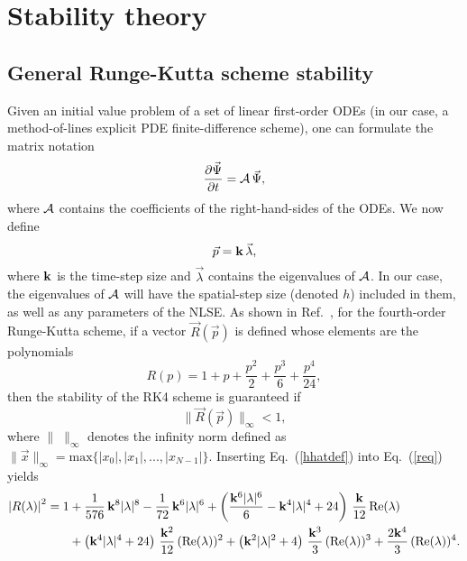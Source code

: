 \documentclass{article}
\begin{document}
\section{Stability theory}
\label{s:rk4sb}
\subsection{General Runge-Kutta scheme stability}
\label{s:rk4sb_gen}
Given an initial value problem of a set of linear first-order ODEs (in our case, a method-of-lines explicit PDE finite-difference scheme), one can formulate the matrix notation
\begin{equation}
\label{scheme}
\frac{\partial \vec \Psi}{\partial t} = {\cal A}\, \vec \Psi,
\end{equation}
where ${\cal A}$ contains the coefficients of the right-hand-sides of the ODEs.  We now define
\begin{equation}
\label{hhatdef}
\vec p = {\bf k}\,\vec \lambda,
\end{equation}
where ${\bf k}$ is the time-step size and $\vec \lambda$ contains the eigenvalues of ${\cal A}$. In our case, the eigenvalues of ${\cal A}$ will have the spatial-step size (denoted $h$) included in them, as well as any parameters of the NLSE.  As shown in Ref.~\cite{RK4_STB_BOOK}, for the fourth-order Runge-Kutta scheme, if a vector $\vec R(\vec p)$ is defined whose elements are the polynomials
\begin{equation}
\label{req}
R(p) = 1 + p + \frac{p^2}{2} + \frac{p^3}{6} + \frac{p^4}{24},
\end{equation}
then the stability of the RK4 scheme is guaranteed if
\begin{equation}
\label{rbound}
\lVert \vec R(\vec p)\rVert_\infty < 1,
\end{equation}
where $\lVert \; \rVert_{\infty}$ denotes the infinity norm defined as $\lVert \vec x \rVert_{\infty} = \mbox{max}\{\lvert x_0 \rvert, \lvert x_1 \rvert, ... ,\lvert x_{N-1} \rvert\}$.  Inserting Eq.~(\ref{hhatdef}) into Eq.~(\ref{req}) yields 
\begin{alignat}{2}
\label{req2}
\left|R(\lambda)\right|^2 = 1 & + \frac{1}{576}\,{\bf k}^8 |\lambda|^8 -
 \frac{1}{72}\,{\bf k}^6 |\lambda|^6 + \left(\frac{{\bf k}^6|\lambda|^6}{6} - {\bf k}^4| \lambda|^4 + 24 \right)\,\frac{{\bf k}}{12}\,\mbox{Re}(\lambda)    \\
&+ \left({\bf k}^4|\lambda|^4 + 24\right)\,\frac{{\bf k}^2}{12}\,(\mbox{Re}(\lambda))^2 + \left({\bf k}^2|\lambda|^2 + 4\right)\,\frac{{\bf k}^3}{3}\,(\mbox{Re}(\lambda))^3 + \frac{2{\bf k}^4}{3}\,(\mbox{Re}(\lambda))^4.
\notag
\end{alignat}
\end{document}
